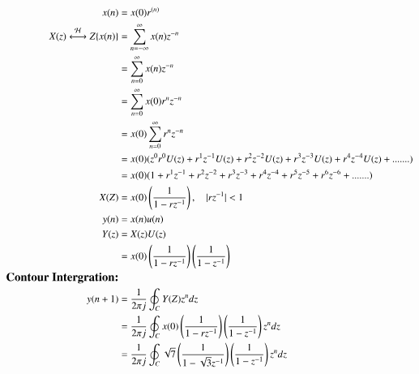 \documentclass[a4,12pt,onecolumn]{IEEEtran}
\begin{document}
 \begin{align}
  x(n) &= x(0)r^{(n)} \\
 X(z)\overset{\mathcal{H}}{ \longleftrightarrow}{Z}\{x(n)\} &= \sum_{n=-\infty}^{\infty} x(n)z^{-n}\\
 &=\sum_{n=0}^{\infty} x(n)z^{-n} \\
&=\sum_{n=0}^{\infty} x(0)r^nz^{-n} \\ 
&=x(0)\sum_{n=0}^{\infty} r^nz^{-n} \\ 
&=x(0)(z^0r^0U(z)+ r^1z^{-1}U(z)+r^2z^{-2}U(z)+r^3z^{-3}U(z)+r^4z^{-4}U(z)+.......)\\
&= x(0)(1+r^1z^{-1}+r^2z^{-2}+r^3z^{-3}+r^4z^{-4}+r^5z^{-5}+r^6z^{-6}+.......)\\
X(Z)&=x(0)\left(\frac{1}{1-rz^{-1}}\right),\quad{|rz^{-1}|<1}\\
y(n)&=x(n)u(n)\\
Y(z)&=X(z)U(z)\\
&=x(0)\left(\frac{1}{1-rz^{-1}}\right)\left(\frac{1}{1-z^{-1}}\right)\\
\textbf{\large{Contour Intergration:}}\\
y(n+1)&=\frac{1}{2\pi{}j}\oint_C {Y(Z)z^{n}}dz\\
&=\frac{1}{2\pi{}j}\oint_C {x(0)\left(\frac{1}{1-rz^{-1}}\right)\left(\frac{1}{1-z^{-1}}\right)z^{n}}dz\\
&=\frac{1}{2\pi{}j}\oint_C {\sqrt{7}\left(\frac{1}{1-\sqrt{3}z^{-1}}\right)\left(\frac{1}{1-z^{-1}}\right)z^{n}}dz\end{align}
\end{document}
